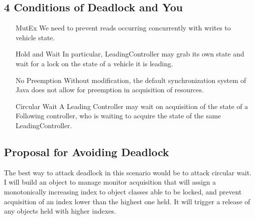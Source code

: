 \documentclass{article}
\begin{document}
\subsection{4 Conditions of Deadlock and You}

\begin{enumerate}
	\item[MutEx] We need to prevent reads occurring concurrently with writes to vehicle state.
	\item[Hold and Wait] In particular, LeadingController may grab its own state and wait for a lock on the state of a vehicle it is leading.
	\item[No Preemption]  Without modification, the default synchronization system of Java does not allow for preemption in acquisition of resources.
	\item[Circular Wait]  A Leading Controller may wait on acquisition of the state of a Following controller, who is waiting to acquire the state of the same LeadingController.
\end{enumerate}
\subsection{Proposal for Avoiding Deadlock} 

The best way to attack deadlock in this scenario would be to attack circular wait.  I will build an object to manage monitor acquisition that will assign a monotonically increasing index to object classes able to be locked, and prevent acquisition of an index lower than the highest one held.  It will trigger a release of any objects held with higher indexes.
\end{document}
